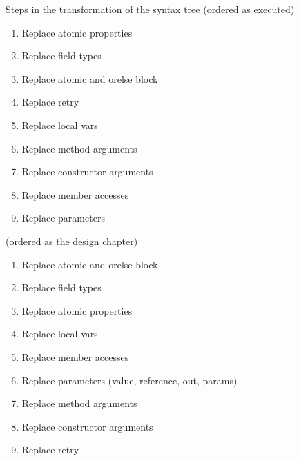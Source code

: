 Steps in the transformation of the syntax tree (ordered as executed)
\begin{enumerate}
	\item Replace atomic properties
	\item Replace field types
	\item Replace atomic and orelse block
	\item Replace retry
	\item Replace local vars
	\item Replace method arguments
	\item Replace constructor arguments
	\item Replace member accesses
	\item Replace parameters
\end{enumerate}

(ordered as the design chapter)
\begin{enumerate}
	\item Replace atomic and orelse block
	\item Replace field types
	\item Replace atomic properties
	\item Replace local vars
	\item Replace member accesses
	\item Replace parameters (value, reference, out, params)
	\item Replace method arguments
	\item Replace constructor arguments
	\item Replace retry
\end{enumerate}
\worksheetend
